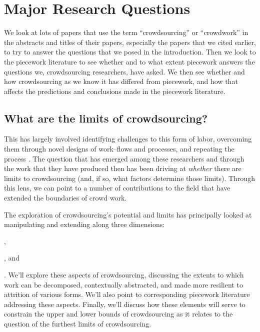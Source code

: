 \documentclass[trackingWork]{subfiles}
\begin{document}
\section{Major Research Questions}


We look at lots of papers that use the term ``crowdsourcing'' or ``crowdwork''
in the abstracts and titles of their papers,
especially the papers that we cited earlier, to try
to answer the questions that we posed in the introduction.
Then we look to the piecework literature to see whether and to what extent
piecework answers the questions we, crowdsourcing researchers, have asked.
We then see whether and how crowdsourcing as we know it has differed from piecework,
and how that affects the predictions and conclusions made in the piecework literature.



\subsection{What are the limits of crowdsourcing?}
This has largely involved
  identifying challenges to this form of labor,
  overcoming them through novel designs of work--flows and processes, and
  repeating the process
\cite[e.g.][]{bernsteinSoylent,foundry,crowdForgeKittur}.
The question that has emerged
among these researchers and
through the work that they have produced then
has been driving at \textit{whether} there are limits to crowdsourcing
(and, if so, what factors determine those limits).
Through this lens, we can point to
a number of contributions to the field that have extended the boundaries of crowd work.

The exploration of crowdsourcing's potential and limits has principally looked at
manipulating and extending along three dimensions:
\begin{inlinelist}
  \item {},
  \item {}, and
  \item {}
\end{inlinelist}.
We'll explore these aspects of crowdsourcing,
discussing the extents to which work can be
decomposed,
contextually abstracted, and
made more resilient to attrition of various forms.
We'll also point to corresponding piecework literature addressing these aspects.
Finally, we'll discuss how these elements will serve
to constrain the upper and lower bounds of crowdsourcing as it relates
to the question of the furthest limits of crowdsourcing.
\end{document}
